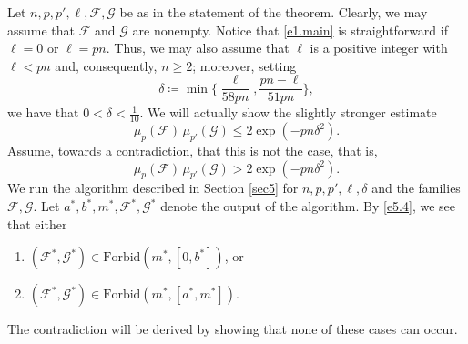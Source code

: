 \documentclass[10pt,a4paper]{amsart}
\theoremstyle{remark}
\newcommand{\meg}{\geqslant}
\newcommand{\mik}{\leqslant}
\newcommand{\Fcal}{\mathcal{F}}
\newcommand{\Gcal}{\mathcal{G}}
\begin{document}
Let $n,p,p',\ell,\Fcal,\Gcal$ be as in the statement of the theorem. Clearly, we may assume that
$\Fcal$ and $\Gcal$ are nonempty. Notice that \eqref{e1.main} is straightforward if $\ell=0$ or $\ell=pn$.
Thus, we may also assume that $\ell$ is a positive integer with $\ell<pn$ and, consequently, $n\meg 2$;
moreover, setting
\begin{equation} \label{e6.1}
\delta\coloneqq \min\Big\{ \frac{\ell}{58pn}, \frac{pn-\ell}{51 pn}\Big\},
\end{equation}
we have that $0<\delta<\frac{1}{10}$. We will actually show the slightly stronger estimate
\begin{equation} \label{e6.2}
\mu_p(\Fcal)\, \mu_{p'}(\Gcal)\mik 2 \exp(-pn \delta^2).
\end{equation}
Assume, towards a contradiction, that this is not the case, that is,
\begin{equation} \label{e6.3}
\mu_p(\Fcal)\,\mu_{p'}(\Gcal)>2\exp(-pn\delta^2).
\end{equation}
We run the algorithm described in Section \ref{sec5} for $n,p,p',\ell,\delta$ and the families
$\Fcal,\Gcal$. Let $a^*,b^*,m^*,\Fcal^*,\Gcal^*$ denote the output of the algorithm.
By \eqref{e5.4}, we see that either
\begin{enumerate}
\item[($\mathcal{A}1$)] $(\Fcal^*,\Gcal^*)\in\mathrm{Forbid}(m^*,[0,b^*])$, or
\item[($\mathcal{A}2$)] $(\Fcal^*,\Gcal^*)\in\mathrm{Forbid}(m^*,[a^*,m^*])$.
\end{enumerate}
The contradiction will be derived by showing that none of these cases can occur.
\end{document}

